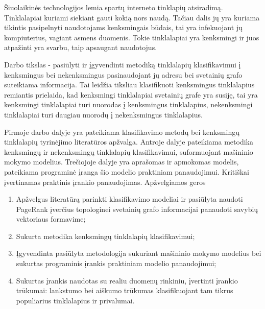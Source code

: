 \documentclass[12pt, a4paper, onecolumn, titlepage, oneside, intlimits]{report}
\begin{document}
\ktuinit{}

\newpage


Šiuolaikinės technologijos lemia spartų interneto tinklapių atsiradimą. Tinklalapiai kuriami siekiant gauti
kokią nors naudą. Tačiau dalis jų yra kuriama tikintis pasipelnyti naudotojams kenksmingais būdais, tai yra
infekuojant jų kompiuterius, vagiant asmens duomenis. Tokie tinklalapiai yra kenksmingi ir juos atpažinti yra
svarbu, taip apsaugant naudotojus.

Darbo tikslas - pasiūlyti ir įgyvendinti metodiką tinklalapių klasifikavimui į kenksmingus bei nekenksmingus
pasinaudojant jų adresu bei svetainių grafo suteikiama informacija. Tai leidžia tiksliau klasifikuoti kenksmingus
tinklalapius remiantis prielaida, kad kenksmingi tinklalapiai svetainių grafe yra susiję, tai yra kenksmingi
tinklalapiai turi nuorodas į kenksmingus tinklalapius, nekenksmingi tinklalapiai turi daugiau nuorodų į nekenksmingus
tinklalapius.

Pirmoje darbo dalyje yra pateikiama klasifikavimo metodų bei kenksmingų tinklalapių tyrinėjimo literatūros apžvalga.
Antroje dalyje pateikiama metodika kenksmingų ir nekenksmingų tinklalapių klasifikavimui, suformuojant mašininio
mokymo modelius. Trečiojoje dalyje yra aprašomas ir apmokomas modelis, pateikiama programinė įranga šio modelio
praktiniam panaudojimui. Kritiškai įvertinamas praktinis įrankio panaudojimas. Apžvelgiamos geros

\newpage










\newpage




\newpage








\begin{enumerate}[label=\arabic*.]
\item Apžvelgus literatūrą parinkti klasifikavimo modeliai ir pasiūlyta naudoti PageRank
 įverčius topologinei svetainių grafo informacijai panaudoti savybių vektoriaus formavime;
\item Sukurta metodika kenksmingų tinklalapių klasifikavimui;
\item Įgyvendinta pasiūlyta metodologija sukuriant mašininio mokymo modelius bei sukurtas
 programinis įrankis praktiniam modelio panaudojimui;
\item Sukurtas įrankis naudotas su realiu duomenų rinkiniu, įvertinti įrankio trūkumai:
lankstumo bei aiškumo trūkumas klasifikuojant tam tikrus populiarius tinklalapius ir privalumai.
\end{enumerate}
\end{document}
